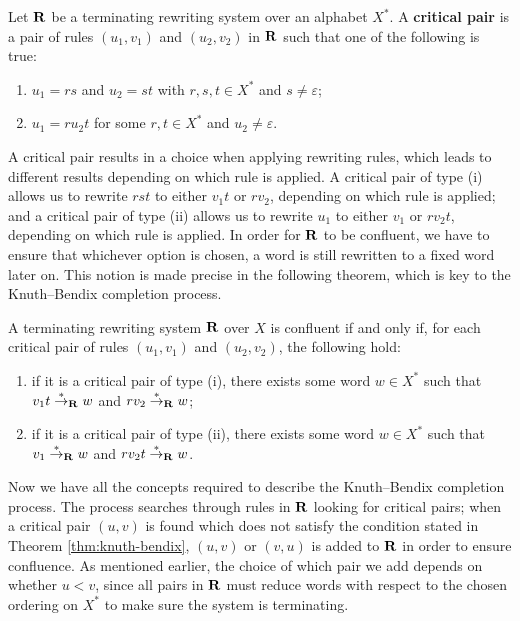 \begin{definition}
  \label{def:critical-pair}
  Let $\mathbf{R}$ be a terminating rewriting system over an alphabet $X^*$.  A
  \textbf{critical pair} is a pair of rules $(u_1, v_1)$ and $(u_2, v_2)$ in
  $\mathbf{R}$ such that one of the following is true:
  \begin{enumerate}[\rm(i)]
  \item $u_1 = rs$ and $u_2 = st$ with $r,s,t \in X^*$ and
    $s \neq \varepsilon$;
  \item $u_1 = ru_2t$ for some $r,t \in X^*$ and $u_2 \neq \varepsilon$.
  \end{enumerate}
\end{definition}

A critical pair results in a choice when applying rewriting rules, which leads
to different results depending on which rule is applied.  A critical pair of
type (i) allows us to rewrite $rst$ to either $v_1t$ or $rv_2$, depending on
which rule is applied; and a critical pair of type (ii) allows us to rewrite
$u_1$ to either $v_1$ or $rv_2t$, depending on which rule is applied.  In order
for $\mathbf{R}$ to be confluent, we have to ensure that whichever option is chosen, a
word is still rewritten to a fixed word later on.  This notion is made precise
in the following theorem, which is key to the Knuth--Bendix completion process.

\begin{theorem}
  \label{thm:knuth-bendix}
  A terminating rewriting system $\mathbf{R}$ over $X$ is confluent if and only if,
  for each critical pair of rules $(u_1, v_1)$ and $(u_2, v_2)$, the following
  hold:
  \begin{enumerate}[\rm(i)]
  \item if it is a critical pair of type (i), there exists some word $w \in X^*$
    such that $v_1t \stackrel{*}{\to}_{\mathbf{R}} w$ and $rv_2 \stackrel{*}{\to}_{\mathbf{R}} w$;
  \item if it is a critical pair of type (ii), there exists some word
    $w \in X^*$ such that $v_1 \stackrel{*}{\to}_{\mathbf{R}} w$ and $rv_2t \stackrel{*}{\to}_{\mathbf{R}} w$.
  \end{enumerate}
\end{theorem}

Now we have all the concepts required to describe the Knuth--Bendix completion
process.  The process searches through rules in $\mathbf{R}$ looking for critical
pairs; when a critical pair $(u, v)$ is found which does not satisfy the
condition stated in Theorem \ref{thm:knuth-bendix}, $(u, v)$ or $(v, u)$ is
added to $\mathbf{R}$ in order to ensure confluence.  As mentioned earlier, the choice
of which pair we add depends on
whether $u < v$, since all pairs in $\mathbf{R}$ must reduce words with respect to the
chosen ordering on $X^*$ to make sure the system is terminating.

